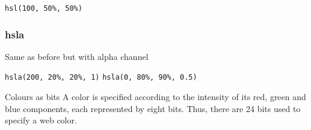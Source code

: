 \texttt{hsl(100, 50\%, 50\%)}

\subsubsection{hsla}

Same as before but with alpha channel

\texttt{hsla(200, 20\%, 20\%, 1)}
\texttt{hsla(0, 80\%, 90\%, 0.5)}

\begin{infobox}{Colours as bits}
    A color is specified according to the intensity of its red, green and blue components, each represented by eight bits. Thus, there are 24 bits used to specify a web color.
\end{infobox}